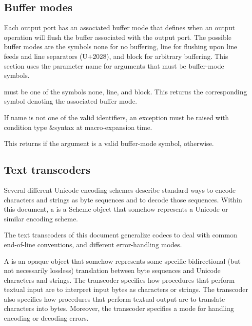 \subsection{Buffer modes}

Each output port has an associated buffer mode that defines when an
output operation will flush the buffer associated with the output
port. The possible buffer modes are the symbols {\cf none} for no buffering,
{\cf line} for flushing upon line feeds and line separators (U+2028), and
{\cf block} for arbitrary buffering.  This section uses the parameter name
 for arguments that must be buffer-mode symbols.

\begin{entry}{%
}
   
 must be one of the symbols {\cf none}, {\cf line}, and
{\cf block}. This returns the corresponding symbol denoting the
associated buffer mode.

If name is not one of the valid identifiers, an exception must be
raised with condition type {\cf\&syntax} at macro-expansion time.
\end{entry}

\begin{entry}{%
}
   
This returns \schtrue{} if the argument is a valid buffer-mode symbol,
\schfalse{} otherwise.
\end{entry}

\subsection{Text transcoders}

Several different Unicode encoding schemes describe standard ways to
encode characters and strings as byte sequences and to decode those
sequences.  Within this document, a  is a Scheme object
that somehow represents a Unicode or similar encoding scheme.

The text transcoders of this document generalize codecs
to deal with common end-of-line conventions, and different
error-handling modes.

A  is an opaque object that somehow represents
some specific bidirectional (but not necessarily lossless) translation
between byte sequences and Unicode characters and strings.  The
transcoder specifies how procedures that perform textual input are to
interpret input bytes as characters or strings.  The transcoder also
specifies how procedures that perform textual output are to translate
characters into bytes.  Moreover, the transcoder specifies a
mode for handling encoding or decoding errors.

